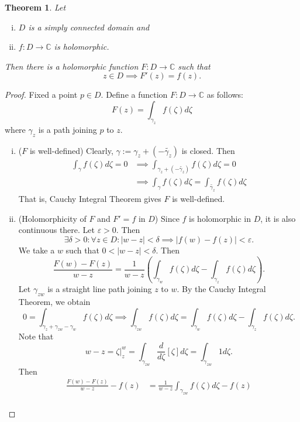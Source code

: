 \documentclass[12pt,openany]{book}
\newtheorem{theorem}{Theorem}[chapter]
\theoremstyle{definition}
\newcommand{\C}{\mathbb{C}}
\newcommand{\of}[1]{\left( #1 \right)}
\newcommand{\abs}[1]{\left\lvert #1 \right\rvert}
\begin{document}
	
	\begin{tcolorbox}[colback=white,colframe=thmcolor,arc=5pt,title={\color{white}\bf Anti-derivative Theorem}]
		\begin{theorem}
			Let \begin{enumerate}[(i)]
				\item $D$ is a simply connected domain and
				\item $f:D\to\C$ is holomorphic.
			\end{enumerate} Then there is a holomorphic function $F:D\to\C$ such that \[
			z\in D\implies F'\of{z}=f\of{z}.
			\]
		\end{theorem}
	\end{tcolorbox}
	\begin{proof}
		Fixed a point $p\in D$. Define a function $F:D\to\C$ as follows: \[
		F\of{z}=\int_{\gamma_z}f\of{\zeta}d\zeta
		\] where $\gamma_z$ is a path joining $p$ to $z$. \begin{enumerate}[(i)]
			\item ($F$ is well-defined) Clearly, $\gamma:=\gamma_z+\of{-\tilde{\gamma_z}}$ is closed. Then
			\begin{align*}
			\int_{\gamma}f\of{\zeta}d\zeta=0&\implies \int_{\gamma_z+\of{-\tilde{\gamma_z}}}f\of{\zeta}d\zeta=0\\
			&\implies\int_{\gamma}f\of{\zeta}d\zeta=\int_{\tilde{\gamma_z}}f\of{\zeta}d\zeta
			\end{align*} That is, Cauchy Integral Theorem gives $F$ is well-defined.
			\item (Holomorphicity of $F$ and $F'=f$ in $D$) Since $f$ is holomorphic in $D$, it is also continuous there. Let $\varepsilon>0$. Then \[
			\exists\delta>0:\forall z\in D:\abs{w-z}<\delta\implies\abs{f\of{w}-f\of{z}}<\varepsilon.
			\] We take a $w$ such that $0<\abs{w-z}<\delta$. Then \[
			\frac{F\of{w}-F\of{z}}{w-z}=\frac{1}{w-z}\of{\int_{\gamma_w}f\of{\zeta}d\zeta-\int_{\gamma_z}f\of{\zeta}d\zeta}.
			\] Let $\gamma_{zw}$ is a straight line path joining $z$ to $w$. By the Cauchy Integral Theorem, we obtain \[
			0=\int_{\gamma_z+\gamma_{zw}-\gamma_w}f\of{\zeta}d\zeta\implies\int_{\gamma_{zw}}f\of{\zeta}d\zeta=\int_{\gamma_w}f\of{\zeta}d\zeta-\int_{\gamma_z}f\of{\zeta}d\zeta.
			\] Note that \[
			w-z=\zeta\bigg|_z^w=\int_{\gamma_{zw}}\frac{d}{d\zeta}\left[\zeta\right] d\zeta=\int_{\gamma_{zw}}1d\zeta.
			\]Then \begin{align*}
			\frac{F\of{w}-F\of{z}}{w-z}-f\of{z}&=\frac{1}{w-z}\int_{\gamma_{zw}}f\of{\zeta}d\zeta-f\of{z}\\

\end{align*}
\end{enumerate}
\end{proof}
\end{document}
